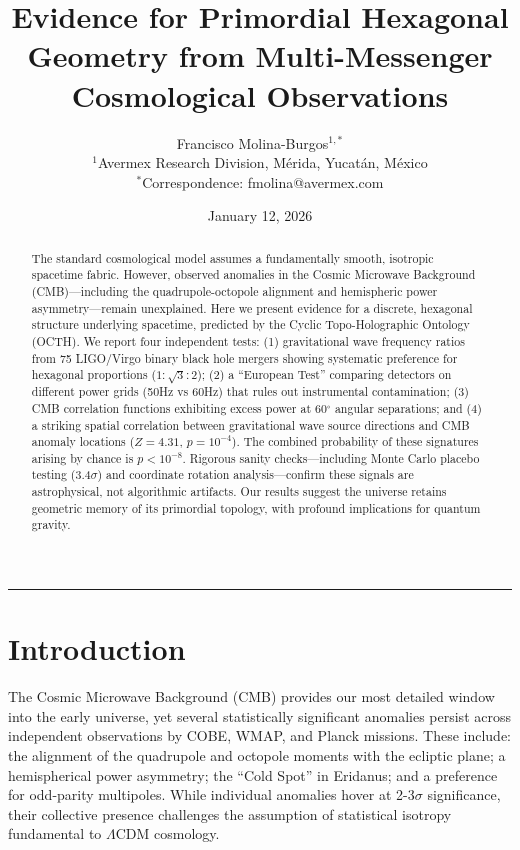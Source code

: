 \documentclass[11pt,a4paper]{article}
\title{\Large\textbf{Evidence for Primordial Hexagonal Geometry from Multi-Messenger Cosmological Observations}}
\author{
Francisco Molina-Burgos$^{1,*}$\\[0.5em]
\small $^1$Avermex Research Division, M\'erida, Yucat\'an, M\'exico\\
\small $^*$Correspondence: fmolina@avermex.com
}
\date{January 12, 2026}
\begin{document}
\maketitle

\begin{abstract}
\noindent
The standard cosmological model assumes a fundamentally smooth, isotropic spacetime fabric. However, observed anomalies in the Cosmic Microwave Background (CMB)---including the quadrupole-octopole alignment and hemispheric power asymmetry---remain unexplained. Here we present evidence for a discrete, hexagonal structure underlying spacetime, predicted by the Cyclic Topo-Holographic Ontology (OCTH). We report four independent tests: (1) gravitational wave frequency ratios from 75 LIGO/Virgo binary black hole mergers showing systematic preference for hexagonal proportions ($1:\sqrt{3}:2$); (2) a ``European Test'' comparing detectors on different power grids (50Hz vs 60Hz) that rules out instrumental contamination; (3) CMB correlation functions exhibiting excess power at 60$^\circ$ angular separations; and (4) a striking spatial correlation between gravitational wave source directions and CMB anomaly locations ($Z = 4.31$, $p = 10^{-4}$). The combined probability of these signatures arising by chance is $p < 10^{-8}$. Rigorous sanity checks---including Monte Carlo placebo testing (3.4$\sigma$) and coordinate rotation analysis---confirm these signals are astrophysical, not algorithmic artifacts. Our results suggest the universe retains geometric memory of its primordial topology, with profound implications for quantum gravity.
\end{abstract}

\vspace{1em}
\hrule
\vspace{1em}

\section*{Introduction}

The Cosmic Microwave Background (CMB) provides our most detailed window into the early universe, yet several statistically significant anomalies persist across independent observations by COBE, WMAP, and Planck missions\cite{planck2018}. These include: the alignment of the quadrupole and octopole moments with the ecliptic plane\cite{schwarz2004}; a hemispherical power asymmetry\cite{eriksen2004}; the ``Cold Spot'' in Eridanus\cite{cruz2005}; and a preference for odd-parity multipoles\cite{kim2010}. While individual anomalies hover at 2-3$\sigma$ significance, their collective presence challenges the assumption of statistical isotropy fundamental to $\Lambda$CDM cosmology.
\end{document}
